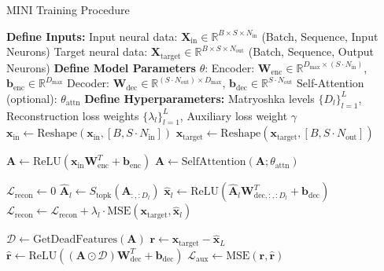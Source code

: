 \begin{algorithm}[h!]
\caption{MINI Training Procedure}
\label{alg:mini_training}
\begin{algorithmic}[1]
\State \textbf{Define Inputs:}
\State \quad Input neural data: $\mathbf{X}_{\text{in}} \in \mathbb{R}^{B \times S \times N_{\text{in}}}$ (Batch, Sequence, Input Neurons)
\State \quad Target neural data: $\mathbf{X}_{\text{target}} \in \mathbb{R}^{B \times S \times N_{\text{out}}}$ (Batch, Sequence, Output Neurons)
\State \textbf{Define Model Parameters} $\theta$:
\State \quad Encoder: $\mathbf{W}_{\text{enc}} \in \mathbb{R}^{D_{\text{max}} \times (S \cdot N_{\text{in}})}$, $\mathbf{b}_{\text{enc}} \in \mathbb{R}^{D_{\text{max}}}$
\State \quad Decoder: $\mathbf{W}_{\text{dec}} \in \mathbb{R}^{(S \cdot N_{\text{out}}) \times D_{\text{max}}}$, $\mathbf{b}_{\text{dec}} \in \mathbb{R}^{S \cdot N_{\text{out}}}$
\State \quad Self-Attention (optional): $\theta_{\text{attn}}$
\State \textbf{Define Hyperparameters:}
\State \quad Matryoshka levels $\{D_l\}_{l=1}^L$, Reconstruction loss weights $\{\lambda_l\}_{l=1}^L$, Auxiliary loss weight $\gamma$
    \State $\mathbf{x}_{\text{in}} \gets \text{Reshape}(\mathbf{x}_{\text{in}}, [B, S \cdot N_{\text{in}}])$
    \State $\mathbf{x}_{\text{target}} \gets \text{Reshape}(\mathbf{x}_{\text{target}}, [B, S \cdot N_{\text{out}}])$
    
    \Statex {}
    \State $\mathbf{A} \gets \text{ReLU}(\mathbf{x}_{\text{in}}\mathbf{W}_{\text{enc}}^T + \mathbf{b}_{\text{enc}})$ 
        \State $\mathbf{A} \gets \text{SelfAttention}(\mathbf{A}; \theta_{\text{attn}})$ 
    \EndIf

    \State $\mathcal{L}_{\text{recon}} \gets 0$
     
        \State $\hat{\mathbf{A}}_l \gets S_{\text{topk}}(\mathbf{A}_{:, :D_l})$ 
        \State $\hat{\mathbf{x}}_l \gets \text{ReLU}(\hat{\mathbf{A}}_l \mathbf{W}_{\text{dec}, :, :D_l}^T + \mathbf{b}_{\text{dec}})$ 
        \State $\mathcal{L}_{\text{recon}} \gets \mathcal{L}_{\text{recon}} + \lambda_l \cdot \text{MSE}(\mathbf{x}_{\text{target}}, \hat{\mathbf{x}}_l)$
    \EndFor
    
    \Statex {}
    \State $\mathcal{D} \gets \text{GetDeadFeatures}(\mathbf{A})$
    \State $\mathbf{r} \gets \mathbf{x}_{\text{target}} - \hat{\mathbf{x}}_L$ 
    \State $\hat{\mathbf{r}} \gets \text{ReLU}((\mathbf{A} \odot \mathcal{D}) \mathbf{W}_{\text{dec}}^T + \mathbf{b}_{\text{dec}})$ 
    \State $\mathcal{L}_{\text{aux}} \gets \text{MSE}(\mathbf{r}, \hat{\mathbf{r}})$
    

\end{algorithmic}
\end{algorithm}
